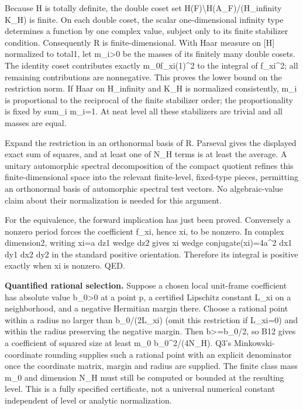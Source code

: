 Because H is totally definite, the double coset set H(F)\textbackslash H(A\_F)/(H\_infinity K\_H) is finite. On each double coset, the scalar one-dimensional infinity type determines a function by one complex value, subject only to its finite stabilizer condition. Consequently R is finite-dimensional. With Haar measure on {[}H{]} normalized to total1, let m\_i\textgreater0 be the masses of its finitely many double cosets. The identity coset contributes exactly m\_0\textbar f\_xi(1)\textbar\^{}2 to the integral of \textbar f\_xi\textbar\^{}2; all remaining contributions are nonnegative. This proves the lower bound on the restriction norm. If Haar on H\_infinity and K\_H is normalized consistently, m\_i is proportional to the reciprocal of the finite stabilizer order; the proportionality is fixed by sum\_i m\_i=1. At neat level all these stabilizers are trivial and all masses are equal.

Expand the restriction in an orthonormal basis of R. Parseval gives the displayed exact sum of squares, and at least one of N\_H terms is at least the average. A unitary automorphic spectral decomposition of the compact quotient refines this finite-dimensional space into the relevant finite-level, fixed-type pieces, permitting an orthonormal basis of automorphic spectral test vectors. No algebraic-value claim about their normalization is needed for this argument.

For the equivalence, the forward implication has just been proved. Conversely a nonzero period forces the coefficient f\_xi, hence xi, to be nonzero. In complex dimension2, writing xi=a dz1 wedge dz2 gives xi wedge conjugate(xi)=4\textbar a\textbar\^{}2 dx1 dy1 dx2 dy2 in the standard positive orientation. Therefore its integral is positive exactly when xi is nonzero. QED.

\textbf{Quantified rational selection.} Suppose a chosen local unit-frame coefficient has absolute value b\_0\textgreater0 at a point p, a certified Lipschitz constant L\_xi on a neighborhood, and a negative Hermitian margin there. Choose a rational point within a radius no larger than b\_0/(2L\_xi) (omit this restriction if L\_xi=0) and within the radius preserving the negative margin. Then b\textgreater=b\_0/2, so B12 gives a coefficient of squared size at least m\_0 b\_0\^{}2/(4N\_H). Q3's Minkowski-coordinate rounding supplies such a rational point with an explicit denominator once the coordinate matrix, margin and radius are supplied. The finite class mass m\_0 and dimension N\_H must still be computed or bounded at the resulting level. This is a fully specified certificate, not a universal numerical constant independent of level or analytic normalization.

